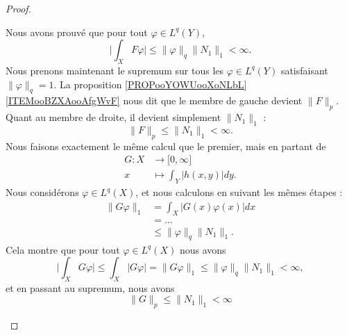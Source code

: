 \begin{proof}
\begin{subproof}
\begin{subproof}
			Nous avons prouvé que pour tout \( \varphi\in L^q(Y)\),
			\begin{equation}
				\big|\int_XF\varphi\big| \leq \| \varphi \|_q\| N_1 \|_1<\infty.
			\end{equation}
			Nous prenons maintenant le supremum sur tous les \( \varphi\in L^q(Y)\) satisfaisant \( \| \varphi \|_q=1\). La proposition \ref{PROPooYOWUooXoNLbL}\ref{ITEMooBZXAooAfgWvF} nous dit que le membre de gauche devient \( \| F \|_p\). Quant au membre de droite, il devient simplement \( \| N_1 \|_1\) :
			\begin{equation}		\label{EQooKIFGooRHBGXl}
				\| F \|_p\leq\| N_1 \|_1<\infty.
			\end{equation}
			Nous faisons exactement le même calcul que le premier, mais en partant de
			\begin{equation}
				\begin{aligned}
					G\colon X & \to \mathopen[ 0,\infty\mathclose] \\
					x         & \mapsto \int_Y| h(x,y) |dy.
				\end{aligned}
			\end{equation}
			Nous considérons \( \varphi\in L^q(X)\), et nous calculons en suivant les mêmes étapes :
			\begin{subequations}
				\begin{align}
					\| G\varphi \|_1 & =\int_X| G(x)\varphi(x) |dx      \\
					                 & =\ldots                          \\
					                 & \leq \| \varphi \|_q\| N_1 \|_1.
				\end{align}
			\end{subequations}
			Cela montre que pour tout \( \varphi\in L^q(X)\) nous avons
			\begin{equation}
				\big| \int_XG\varphi \big|\leq \int_X| G\varphi |= \| G\varphi \|_1\leq \| \varphi \|_q\| N_1 \|_1<\infty,
			\end{equation}
			et en passant au supremum, nous avons
			\begin{equation}
				\| G \|_p\leq \| N_1 \|_1<\infty
			\end{equation}


\end{subproof}
\end{subproof}
\end{proof}
